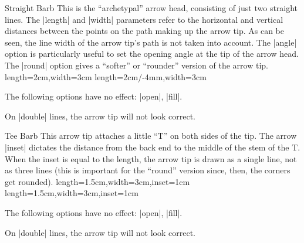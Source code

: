 \begin{arrowtip}{Straight Barb}
  {
    This is the ``archetypal'' arrow head, consisting of just two
    straight lines. The |length| and |width| parameters refer to the
    horizontal and vertical distances between the points on the path
    making up the arrow tip. As can be seen, the line width of the
    arrow tip's path is not taken into account. 
    The |angle| option is particularly useful to set
    the opening angle at the tip of the arrow head. The |round| option
    gives a ``softer'' or ``rounder'' version of the arrow tip. 
  }
  {length=2cm,width=3cm}
  {length=2cm/-4mm,width=3cm}
  
  \begin{arrowexamples}
    \arrowexample[]
    \arrowexampledup[]
    \arrowexampledupdot[]
    \arrowexample[length=5pt]
    \arrowexample[length=5pt,width=5pt]
    \arrowexample[line width=2pt]
    \arrowexample[reversed]
    \arrowexample[angle=60:2pt 3]
    \arrowexample[round]
    \arrowexample[slant=.3]
    \arrowexample[left]
    \arrowexample[right]
    \arrowexample[red]
  \end{arrowexamples}
  The following options have no effect: |open|, |fill|.

  On |double| lines, the arrow tip will not look correct.
\end{arrowtip}


\begin{arrowtip}{Tee Barb}
  {
    This arrow tip attaches a little ``T'' on both sides of the
    tip. The arrow |inset| dictates the distance from the back end to
    the middle of the stem of the T. When the inset is equal to the
    length, the arrow tip is drawn as a single line, not as three
    lines (this is important for the ``round'' version since, then,
    the corners get rounded). 
  }
  {length=1.5cm,width=3cm,inset=1cm}
  {length=1.5cm,width=3cm,inset=1cm}
  
  \begin{arrowexamples}
    \arrowexample[]
    \arrowexampledup[sep]
    \arrowexampledupdot[sep]
    \arrowexample[inset=0pt]
    \arrowexample[inset'=0pt 1]
    \arrowexample[line width=2pt]
    \arrowexample[round]
    \arrowexample[round,inset'=0pt 1]
    \arrowexample[slant=.3]
    \arrowexample[left]
    \arrowexample[right]
    \arrowexample[red]
  \end{arrowexamples}
  The following options have no effect: |open|, |fill|.

  On |double| lines, the arrow tip will not look correct.
\end{arrowtip}




